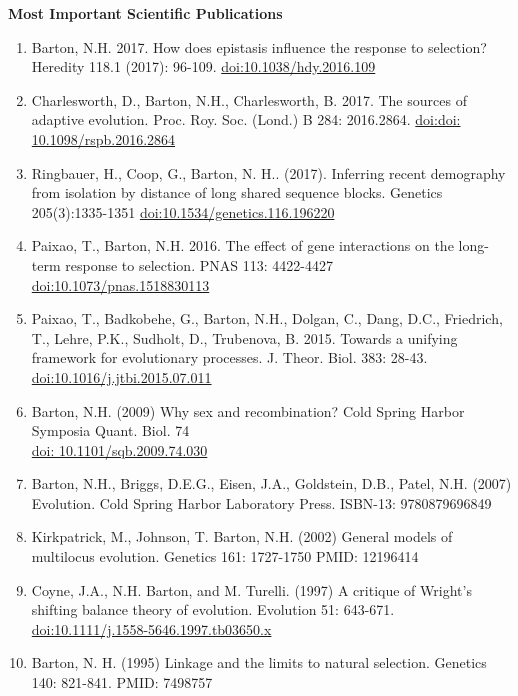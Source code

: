 \documentclass[10pt]{article}
\begin{document}
\begin{cv}
\textbf{ Most Important Scientific Publications}
            \begin{enumerate}%
\item Barton, N.H. 2017. How does epistasis influence the response to selection? Heredity 118.1 (2017): 96-109. \href{http://dx.doi.org/10.1038/hdy.2016.109}{doi:10.1038/hdy.2016.109}
\item Charlesworth, D., Barton, N.H., Charlesworth, B. 2017. The sources of adaptive evolution. Proc. Roy. Soc. (Lond.) B 284: 2016.2864. \href{http://dx.doi.org/doi: 10.1098/rspb.2016.2864}{doi:doi: 10.1098/rspb.2016.2864}
\item Ringbauer, H., Coop, G., Barton, N. H.. (2017). Inferring recent demography from isolation by distance of long shared sequence blocks. Genetics 205(3):1335-1351 \href{http://dx.doi.org/10.1534/genetics.116.196220}{doi:10.1534/genetics.116.196220}
\item Paixao, T., Barton, N.H. 2016. The effect of gene interactions on the long-term response to selection. PNAS 113: 4422-4427 \href{http://dx.doi.org/10.1073/pnas.1518830113}{doi:10.1073/pnas.1518830113}
\item Paixao, T., Badkobehe, G., Barton, N.H., Dolgan, C., Dang, D.C., Friedrich, T., Lehre, P.K., Sudholt, D., Trubenova, B. 2015. Towards a unifying framework for evolutionary processes. J. Theor. Biol. 383: 28-43.\\ \href{http://dx.doi.org/doi:10.1016/j.jtbi.2015.07.011}{doi:10.1016/j.jtbi.2015.07.011}
\item Barton, N.H. (2009) Why sex and recombination? Cold Spring Harbor Symposia Quant. Biol. 74 \\ \href{http://dx.doi.org/doi: 10.1101/sqb.2009.74.030}{doi: 10.1101/sqb.2009.74.030}
\item Barton, N.H., Briggs, D.E.G., Eisen, J.A., Goldstein, D.B., Patel, N.H. (2007) Evolution. Cold Spring Harbor Laboratory Press. ISBN-13: 9780879696849
\item Kirkpatrick, M., Johnson, T. Barton, N.H. (2002) General models of multilocus evolution. Genetics 161: 1727-1750 PMID: 12196414 
\item Coyne, J.A., N.H. Barton, and M. Turelli. (1997) A critique of Wright's shifting balance theory of evolution. Evolution 51: 643-671. \href{http://dx.doi.org/10.1111/j.1558-5646.1997.tb03650.x}{doi:10.1111/j.1558-5646.1997.tb03650.x}
\item Barton, N. H. (1995) Linkage and the limits to natural selection. Genetics 140: 821-841. PMID: 7498757
\end{enumerate}	



\end{cv}
\end{document}
